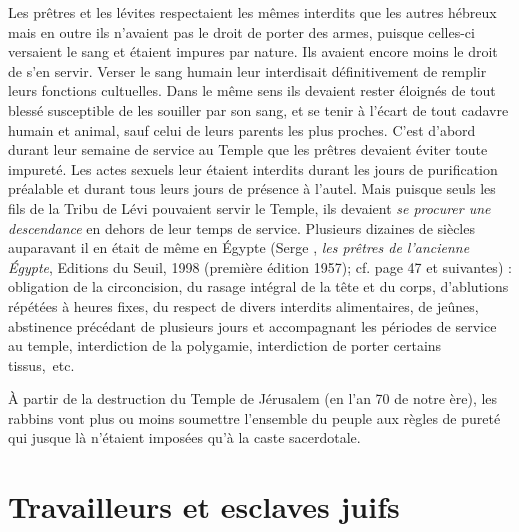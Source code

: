  Les prêtres et les lévites respectaient les mêmes interdits que les autres hébreux mais en outre ils n'avaient pas le droit de porter des armes, puisque celles-ci versaient le sang et étaient impures par nature. Ils avaient encore moins le droit de s'en servir. Verser le sang humain leur interdisait définitivement de remplir leurs fonctions cultuelles. Dans le même sens ils devaient rester éloignés de tout blessé susceptible de les souiller par son sang, et se tenir à l'écart de tout cadavre humain et animal, sauf celui de leurs parents les plus proches. C'est d'abord durant leur semaine de service au Temple que les prêtres devaient éviter toute impureté. Les actes sexuels leur étaient interdits durant les jours de purification préalable et durant tous leurs jours de présence à l'autel. Mais puisque seuls les fils de la Tribu de Lévi pouvaient servir le Temple, ils devaient \emph{se procurer une descendance} en dehors de leur temps de service. Plusieurs dizaines de siècles auparavant il en était de même en Égypte (Serge , \emph{les prêtres de l'ancienne Égypte}, Editions du Seuil, 1998 (première édition 1957); cf. page 47 et suivantes) : obligation de la circoncision, du rasage intégral de la tête et du corps, d'ablutions répétées à heures fixes, du respect de divers interdits alimentaires, de jeûnes, abstinence précédant de plusieurs jours et accompagnant les périodes de service au temple, interdiction de la polygamie, interdiction de porter certains tissus,~etc. 
 
 À partir de la destruction du Temple de Jérusalem (en l'an 70 de notre ère), les rabbins vont plus ou moins soumettre l'ensemble du peuple aux règles de pureté qui jusque là n'étaient imposées qu'à la caste sacerdotale.
 
 \section{Travailleurs et esclaves juifs}


